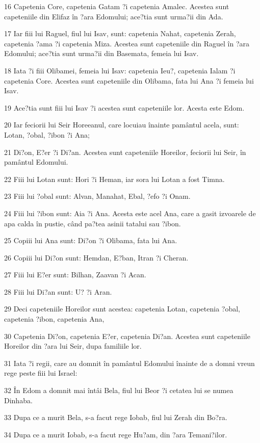 \par 16 Capetenia Core, capetenia Gatam ?i capetenia Amalec. Acestea sunt capeteniile din Elifaz în ?ara Edomului; ace?tia sunt urma?ii din Ada.
\par 17 Iar fiii lui Raguel, fiul lui Isav, sunt: capetenia Nahat, capetenia Zerah, capetenia ?ama ?i capetenia Miza. Acestea sunt capeteniile din Raguel în ?ara Edomului; ace?tia sunt urma?ii din Basemata, femeia lui Isav.
\par 18 Iata ?i fiii Olibamei, femeia lui Isav: capetenia Ieu?, capetenia Ialam ?i capetenia Core. Acestea sunt capeteniile din Olibama, fata lui Ana ?i femeia lui Isav.
\par 19 Ace?tia sunt fiii lui Isav ?i acestea sunt capeteniile lor. Acesta este Edom.
\par 20 Iar feciorii lui Seir Horeeanul, care locuiau înainte pamântul acela, sunt: Lotan, ?obal, ?ibon ?i Ana;
\par 21 Di?on, E?er ?i Di?an. Acestea sunt capeteniile Horeilor, feciorii lui Seir, în pamântul Edomului.
\par 22 Fiii lui Lotan sunt: Hori ?i Heman, iar sora lui Lotan a fost Timna.
\par 23 Fiii lui ?obal sunt: Alvan, Manahat, Ebal, ?efo ?i Onam.
\par 24 Fiii lui ?ibon sunt: Aia ?i Ana. Acesta este acel Ana, care a gasit izvoarele de apa calda în pustie, când pa?tea asinii tatalui sau ?ibon.
\par 25 Copiii lui Ana sunt: Di?on ?i Olibama, fata lui Ana.
\par 26 Copiii lui Di?on sunt: Hemdan, E?ban, Itran ?i Cheran.
\par 27 Fiii lui E?er sunt: Bilhan, Zaavan ?i Acan.
\par 28 Fiii lui Di?an sunt: U? ?i Aran.
\par 29 Deci capeteniile Horeilor sunt acestea: capetenia Lotan, capetenia ?obal, capetenia ?ibon, capetenia Ana,
\par 30 Capetenia Di?on, capetenia E?er, capetenia Di?an. Acestea sunt capeteniile Horeilor din ?ara lui Seir, dupa familiile lor.
\par 31 Iata ?i regii, care au domnit în pamântul Edomului înainte de a domni vreun rege peste fiii lui Israel:
\par 32 În Edom a domnit mai întâi Bela, fiul lui Beor ?i cetatea lui se numea Dinhaba.
\par 33 Dupa ce a murit Bela, s-a facut rege Iobab, fiul lui Zerah din Bo?ra.
\par 34 Dupa ce a murit Iobab, s-a facut rege Hu?am, din ?ara Temani?ilor.
